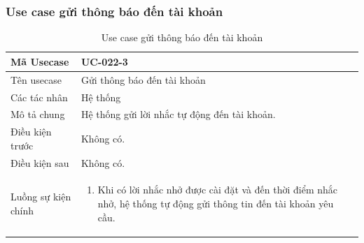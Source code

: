 \documentclass[12pt,a4paper]{article}
\begin{document}
    \subsubsection*{Use case gửi thông báo đến tài khoản}
    \begin{table}[H]
        \centering
        \begin{tabular}{|p{3.5cm}|p{11.5cm}|c|}
            \hline
            Mã Usecase      & UC-022-3                                     \\
            \hline
            Tên usecase     & Gửi thông báo đến tài khoản                  \\
            \hline
            Các tác nhân    & Hệ thống                                     \\
            \hline
            Mô tả chung     & Hệ thống gửi lời nhắc tự động đến tài khoản. \\
            \hline

            Điều kiện trước & Không có.                                    \\
            \hline

            Điều kiện sau   & Không có.                                    \\
            \hline

            Luồng sự kiện chính & \vspace{-.8cm}\begin{enumerate}
                                                    \item Khi có lời nhắc nhở được cài đặt và đến thời điểm nhắc nhở, hệ thống tự động gửi thông tin đến tài khoản yêu cầu.
            \end{enumerate}
            \\
            \hline
        \end{tabular}
        \caption{Use case gửi thông báo đến tài khoản}

    \end{table}


\end{document}
